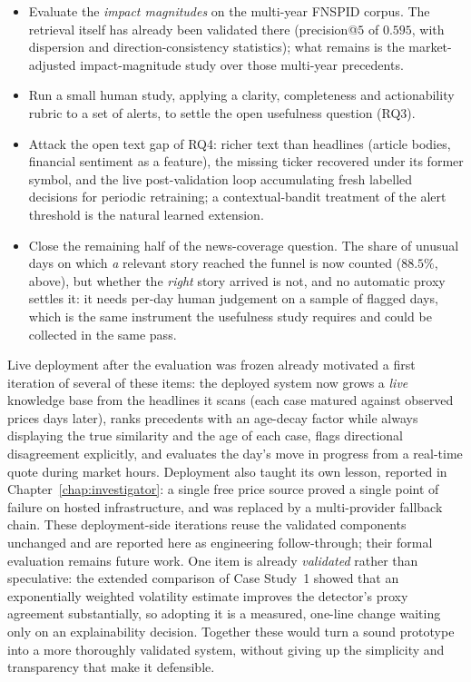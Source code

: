 \begin{itemize}
  \item Evaluate the \emph{impact magnitudes} on the multi-year FNSPID corpus. The retrieval itself
        has already been validated there (precision@$5$ of $0.595$, with dispersion and
        direction-consistency statistics); what remains is the market-adjusted impact-magnitude
        study over those multi-year precedents.
  \item Run a small human study, applying a clarity, completeness and actionability rubric to a set of
        alerts, to settle the open usefulness question (RQ3).
  \item Attack the open text gap of RQ4: richer text than headlines (article bodies, financial
        sentiment as a feature), the missing ticker recovered under its former symbol, and the live
        post-validation loop accumulating fresh labelled decisions for periodic retraining; a
        contextual-bandit treatment of the alert threshold is the natural learned extension.
  \item Close the remaining half of the news-coverage question. The share of unusual days on which
        \emph{a} relevant story reached the funnel is now counted ($88.5\%$, above), but whether the
        \emph{right} story arrived is not, and no automatic proxy settles it: it needs per-day human
        judgement on a sample of flagged days, which is the same instrument the usefulness study
        requires and could be collected in the same pass.
\end{itemize}
Live deployment after the evaluation was frozen already motivated a first iteration of several of these
items: the deployed system now grows a \emph{live} knowledge base from the headlines it scans (each case
matured against observed prices days later), ranks precedents with an age-decay factor while always
displaying the true similarity and the age of each case, flags directional disagreement explicitly, and
evaluates the day's move in progress from a real-time quote during market hours. Deployment also taught
its own lesson, reported in Chapter~\ref{chap:investigator}: a single free price source proved a single
point of failure on hosted infrastructure, and was replaced by a multi-provider fallback chain. These
deployment-side iterations reuse the validated components unchanged and are reported here as engineering
follow-through; their formal evaluation remains future work. One item is already \emph{validated} rather
than speculative: the extended comparison of Case Study~1 showed that an exponentially weighted
volatility estimate improves the detector's proxy agreement substantially, so adopting it is a measured,
one-line change waiting only on an explainability decision. Together these would turn a sound prototype
into a more thoroughly validated system, without giving up the simplicity and transparency that make it
defensible.
